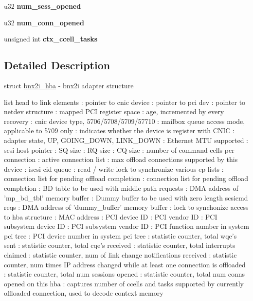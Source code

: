 \begin{DoxyCompactItemize}
\item 
\hypertarget{structbnx2i__hba_a823e7c41cacbab229a093ddcc7b670ad}{
u32 {\bfseries num\_\-sess\_\-opened}}
\label{structbnx2i__hba_a823e7c41cacbab229a093ddcc7b670ad}

\item 
\hypertarget{structbnx2i__hba_a86f97e5d76f52bbf0d65fd3a7f973000}{
u32 {\bfseries num\_\-conn\_\-opened}}
\label{structbnx2i__hba_a86f97e5d76f52bbf0d65fd3a7f973000}

\item 
\hypertarget{structbnx2i__hba_a6df9ad211e4e14ccd4cdeb83816ed3ac}{
unsigned int {\bfseries ctx\_\-ccell\_\-tasks}}
\label{structbnx2i__hba_a6df9ad211e4e14ccd4cdeb83816ed3ac}

\end{DoxyCompactItemize}


\subsection{Detailed Description}
struct \hyperlink{structbnx2i__hba}{bnx2i\_\-hba} -\/ bnx2i adapter structure

list head to link elements : pointer to cnic device : pointer to pci dev : pointer to netdev structure : mapped PCI register space : age, incremented by every recovery : cnic device type, 5706/5708/5709/57710 : mailbox queue access mode, applicable to 5709 only : indicates whether the device is register with CNIC : adapter state, UP, GOING\_\-DOWN, LINK\_\-DOWN : Ethernet MTU supported : scsi host pointer : SQ size : RQ size : CQ size : number of command cells per connection : active connection list : max offload connections supported by this device : iscsi cid queue : read / write lock to synchronize various ep lists : connection list for pending offload completion : connection list for pending offload completion : BD table to be used with middle path requests : DMA address of 'mp\_\-bd\_\-tbl' memory buffer : Dummy buffer to be used with zero length scsicmd reqs : DMA address of 'dummy\_\-buffer' memory buffer : lock to synchonize access to hba structure : MAC address : PCI device ID : PCI vendor ID : PCI subsystem device ID : PCI subsystem vendor ID : PCI function number in system pci tree : PCI device number in system pci tree : statistic counter, total wqe's sent : statistic counter, total cqe's received : statistic counter, total interrupts claimed : statistic counter, num of link change notifications received : statistic counter, num times IP address changed while at least one connection is offloaded : statistic counter, total num sessions opened : statistic counter, total num conns opened on this hba : captures number of ccells and tasks supported by currently offloaded connection, used to decode context memory

